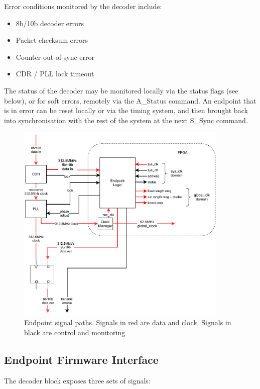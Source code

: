 \documentclass{dune}
\begin{document}
Error conditions monitored by the decoder include:

\begin{itemize}
	\item 8b/10b decoder errors
	\item Packet checksum errors
	\item Counter-out-of-sync error
	\item CDR / PLL lock timeout
\end{itemize}

The status of the decoder may be monitored locally via the status flags (see below), or for soft errors, remotely via the A\_Status command. An endpoint that is in error can be reset locally or via the timing system, and then brought back into synchronisation with the rest of the system at the next S\_Sync command.

\begin{figure}[p]
	\centering
	\includegraphics[width=0.9\textwidth]{timing_endpoint_block.pdf}
	\caption{Endpoint signal paths. Signals in red are data and clock. Signals in black are control and monitoring}
	\label{fig:fw_if}
\end{figure}

\subsection{Endpoint Firmware Interface}

The decoder block exposes three sets of signals:
\end{document}
